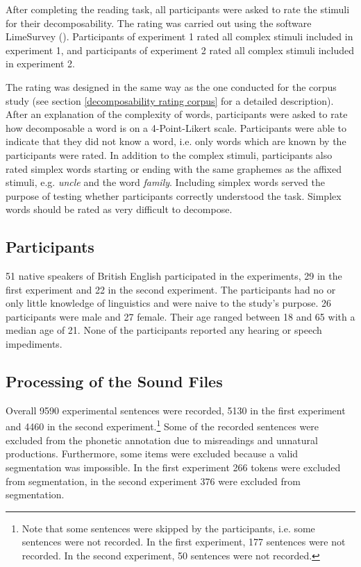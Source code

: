 After completing the reading task, all participants were asked to rate the stimuli for their decomposability. The rating was carried out using the software LimeSurvey (\citealt{LimeSurveyProjectTeam.2015}). Participants of experiment 1 rated all complex stimuli included in experiment 1, and participants of experiment 2 rated all complex stimuli included in experiment 2. 

The rating was designed in the same way as the one conducted for the corpus study (see section \ref{decomposability rating corpus} for a detailed description). After an explanation of the complexity of words, participants were asked to rate how decomposable a word is on a 4-Point-Likert scale. Participants were able to indicate that they did not know a word, i.e. only words which are known by the participants were rated. In addition to the complex stimuli, participants also rated simplex words starting or ending with the same graphemes as the affixed stimuli, e.g. \textit{{un}cle} and the word \textit{fami{ly}}. Including simplex words served the purpose of testing whether participants correctly understood the task. Simplex words should be rated as very difficult to decompose. 





	
	\subsection{Participants}
	
51 native speakers of British English participated in the experiments, 29 in the first experiment and 22 in the second experiment. The participants had no or only little knowledge of linguistics and were naive to the study's purpose. 26 participants were male and 27 female. Their age ranged between 18 and 65 with a median age of 21. None of the participants reported any hearing or speech impediments.
	


\subsection{Processing of the Sound Files}

Overall 9590 experimental sentences were recorded, 5130 in the first experiment and 4460 in the second experiment.\footnote{Note that some sentences were skipped by the participants, i.e. some sentences were not recorded. In the first experiment, 177 sentences were not recorded. In the second experiment, 50 sentences were not recorded. } 
Some of the recorded sentences were excluded from the phonetic annotation due to misreadings and unnatural productions. Furthermore, some items  were excluded because a valid segmentation was impossible. In the first experiment 266 tokens were excluded from segmentation, in the second experiment 376 were excluded from segmentation.



